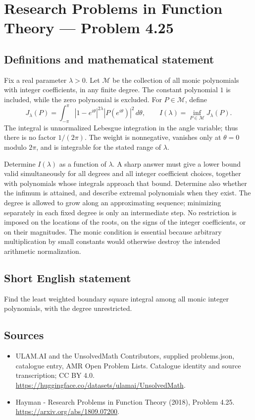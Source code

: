 \documentclass[11pt,a4paper]{article}
\begin{document}
\section*{Research Problems in Function Theory — Problem 4.25}\label{statement}

\subsection{Definitions and mathematical statement}
Fix a real parameter $\lambda>0$. Let $\mathcal M$ be the collection
of all monic polynomials with integer coefficients, in any finite
degree. The constant polynomial $1$ is included, while the zero
polynomial is excluded. For $P\in\mathcal M$, define
\[
 J_\lambda(P)=\int_{-\pi}^{\pi}
       |1-e^{i\theta}|^{2\lambda}|P(e^{i\theta})|^2\,d\theta,
 \qquad I(\lambda)=\inf_{P\in\mathcal M}J_\lambda(P).
\]
The integral is unnormalized Lebesgue integration in the angle
variable; thus there is no factor $1/(2\pi)$. The weight is
nonnegative, vanishes only at $\theta=0$ modulo $2\pi$, and is
integrable for the stated range of $\lambda$.

Determine $I(\lambda)$ as a function of $\lambda$. A sharp answer
must give a lower bound valid simultaneously for all degrees and
all integer coefficient choices, together with polynomials whose
integrals approach that bound. Determine also whether the infimum
is attained, and describe extremal polynomials when they exist.
The degree is allowed to grow along an approximating sequence;
minimizing separately in each fixed degree is only an intermediate
step. No restriction is imposed on the locations of the roots,
on the signs of the integer coefficients, or on their magnitudes.
The monic condition is essential because arbitrary multiplication
by small constants would otherwise destroy the intended arithmetic
normalization.
\subsection{Short English statement}
Find the least weighted boundary square integral among all monic integer polynomials, with the degree unrestricted.
\subsection{Sources}
\begin{itemize}
\item[S1] ULAM.AI and the UnsolvedMath Contributors, supplied problems.json, catalogue entry, AMR Open Problem Lists. Catalogue identity and source transcription; CC BY 4.0.
\url{https://huggingface.co/datasets/ulamai/UnsolvedMath}.
\item[S2] Hayman - Research Problems in Function Theory (2018), Problem 4.25. 
\url{https://arxiv.org/abs/1809.07200}.
\end{itemize}
\end{document}
